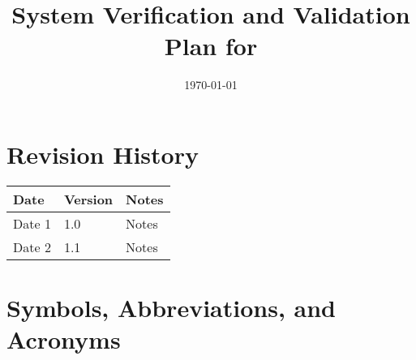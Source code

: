 \documentclass[12pt, titlepage]{article}
\begin{document}
\title{System Verification and Validation Plan for \progname{}}
\author{\authname}
\date{\today}

\maketitle


\section*{Revision History}

\begin{tabularx}{\textwidth}{p{3cm}p{2cm}X}
\toprule {\bf Date} & {\bf Version} & {\bf Notes}\\
\midrule
Date 1 & 1.0 & Notes\\
Date 2 & 1.1 & Notes\\
\bottomrule
\end{tabularx}



\newpage

\tableofcontents

\listoftables
{}

\listoffigures
{}

\newpage

\section{Symbols, Abbreviations, and Acronyms}
\end{document}
